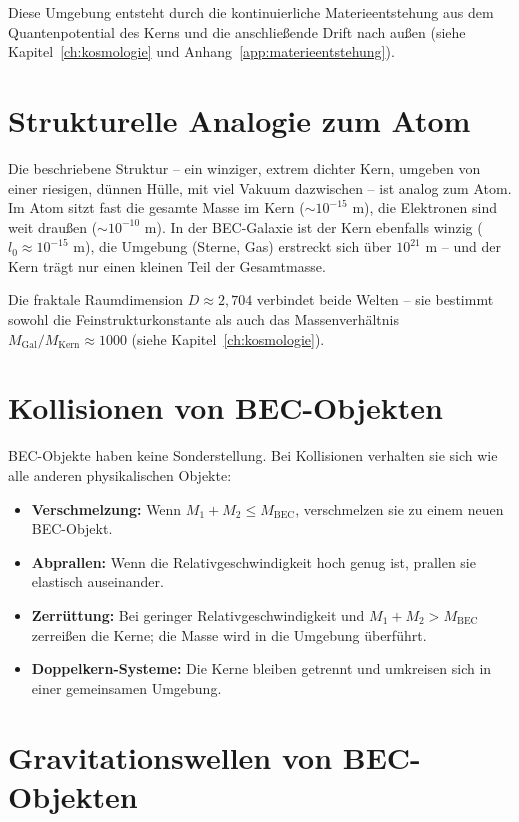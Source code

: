 Diese Umgebung entsteht durch die kontinuierliche Materieentstehung aus dem Quantenpotential des Kerns und die anschließende Drift nach außen (siehe Kapitel~\ref{ch:kosmologie} und Anhang~\ref{app:materieentstehung}).

\section{Strukturelle Analogie zum Atom}
\label{sec:bec_atom_analogie}

Die beschriebene Struktur – ein winziger, extrem dichter Kern, umgeben von einer riesigen, dünnen Hülle, mit viel Vakuum dazwischen – ist analog zum Atom. Im Atom sitzt fast die gesamte Masse im Kern (\( \sim 10^{-15} \) m), die Elektronen sind weit draußen (\( \sim 10^{-10} \) m). In der BEC-Galaxie ist der Kern ebenfalls winzig (\( l_0 \approx 10^{-15} \) m), die Umgebung (Sterne, Gas) erstreckt sich über \( 10^{21} \) m – und der Kern trägt nur einen kleinen Teil der Gesamtmasse.

Die fraktale Raumdimension \( D \approx 2,704 \) verbindet beide Welten – sie bestimmt sowohl die Feinstrukturkonstante als auch das Massenverhältnis \( M_{\text{Gal}}/M_{\text{Kern}} \approx 1000 \) (siehe Kapitel~\ref{ch:kosmologie}).

\section{Kollisionen von BEC-Objekten}
\label{sec:bec_kollisionen}

BEC-Objekte haben keine Sonderstellung. Bei Kollisionen verhalten sie sich wie alle anderen physikalischen Objekte:

\begin{itemize}
    \item \textbf{Verschmelzung:} Wenn \( M_1 + M_2 \leq M_{\text{BEC}} \), verschmelzen sie zu einem neuen BEC-Objekt.
    \item \textbf{Abprallen:} Wenn die Relativgeschwindigkeit hoch genug ist, prallen sie elastisch auseinander.
    \item \textbf{Zerrüttung:} Bei geringer Relativgeschwindigkeit und \( M_1 + M_2 > M_{\text{BEC}} \) zerreißen die Kerne; die Masse wird in die Umgebung überführt.
    \item \textbf{Doppelkern-Systeme:} Die Kerne bleiben getrennt und umkreisen sich in einer gemeinsamen Umgebung.
\end{itemize}

\section{Gravitationswellen von BEC-Objekten}
\label{sec:bec_gravitationswellen}

